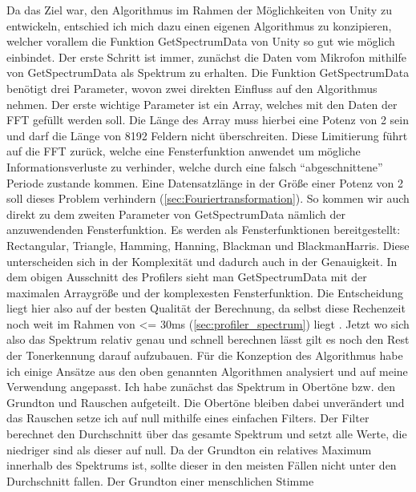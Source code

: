 Da das Ziel war, den Algorithmus im Rahmen der Möglichkeiten von Unity zu entwickeln, entschied ich mich dazu einen eigenen Algorithmus zu konzipieren, welcher vorallem die Funktion GetSpectrumData von Unity so gut wie möglich einbindet. Der erste Schritt ist immer, zunächst die Daten vom Mikrofon mithilfe von GetSpectrumData als Spektrum zu erhalten. Die Funktion GetSpectrumData benötigt drei Parameter, wovon zwei direkten Einfluss auf den Algorithmus nehmen. Der erste wichtige Parameter ist ein Array, welches mit den Daten der FFT gefüllt werden soll. Die Länge des Array muss hierbei eine Potenz von 2 sein und darf die Länge von 8192 Feldern nicht überschreiten. Diese Limitierung führt auf die FFT zurück, welche eine Fensterfunktion anwendet um mögliche Informationsverluste zu verhinder, welche durch eine falsch ``abgeschnittene'' Periode zustande kommen. Eine Datensatzlänge in der Größe einer Potenz von 2 soll dieses Problem verhindern (\ref{sec:Fouriertransformation}).  So kommen wir auch direkt zu dem zweiten Parameter von GetSpectrumData nämlich der anzuwendenden Fensterfunktion. Es werden als Fensterfunktionen bereitgestellt: Rectangular, Triangle, Hamming, Hanning, Blackman und BlackmanHarris. Diese unterscheiden sich in der Komplexität und dadurch auch in der Genauigkeit. In dem obigen Ausschnitt des Profilers sieht man GetSpectrumData mit der maximalen Arraygröße und der komplexesten Fensterfunktion. Die Entscheidung liegt hier also auf der besten Qualität der Berechnung, da selbst diese Rechenzeit noch weit im Rahmen von <= 30ms (\ref{sec:profiler_spectrum}) liegt \cite{lago2004quest}. Jetzt wo sich also das Spektrum relativ genau und schnell berechnen lässt gilt es noch den Rest der Tonerkennung darauf aufzubauen. Für die Konzeption des Algorithmus habe ich einige Ansätze aus den oben genannten Algorithmen analysiert und auf meine Verwendung angepasst. Ich habe zunächst das Spektrum in Obertöne bzw. den Grundton und Rauschen aufgeteilt. Die Obertöne bleiben dabei unverändert und das Rauschen setze ich auf null mithilfe eines einfachen Filters. Der Filter berechnet den Durchschnitt über das gesamte Spektrum und setzt alle Werte, die niedriger sind als dieser auf null. Da der Grundton ein relatives Maximum innerhalb des Spektrums ist, sollte dieser in den meisten Fällen nicht unter den Durchschnitt fallen. Der Grundton einer menschlichen Stimme 
